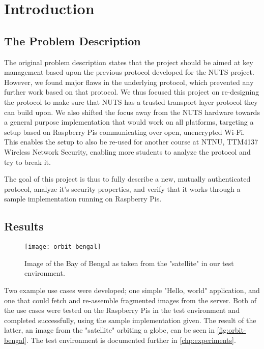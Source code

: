 \chapter{Introduction}
\label{chp:introduction}

\section{The Problem Description}\label{sec:problem_description}

The original problem description states that the project should be aimed at key management based upon the previous protocol developed for the NUTS project. However, we found major flaws in the underlying protocol, which prevented any further work based on that protocol. We thus focused this project on re-designing the protocol to make sure that NUTS has a trusted transport layer protocol they can build upon. We also shifted the focus away from the NUTS hardware towards a general purpose implementation that would work on all platforms, targeting a setup based on Raspberry Pis communicating over open, unencrypted Wi-Fi. This enables the setup to also be re-used for another course at NTNU, TTM4137 Wireless Network Security, enabling more students to analyze the protocol and try to break it.

The goal of this project is thus to fully describe a new, mutually authenticated protocol, analyze it's security properties, and verify that it works through a sample implementation running on Raspberry Pis.

\section{Results}\label{sec:results}

\begin{figure}[ht!]
\centering
    \texttt{[image: orbit-bengal]}
    \caption{Image of the Bay of Bengal as taken from the "satellite" in our test environment.}\label{fig:orbit-bengal}
\end{figure}

Two example use cases were developed; one simple "Hello, world" application, and one that could fetch and re-assemble fragmented images from the server. Both of the use cases were tested on the Raspberry Pis in the test environment and completed successfully, using the sample implementation given. The result of the latter, an image from the "satellite" orbiting a globe, can be seen in \autoref{fig:orbit-bengal}. The test environment is documented further in \autoref{chp:experiments}.


